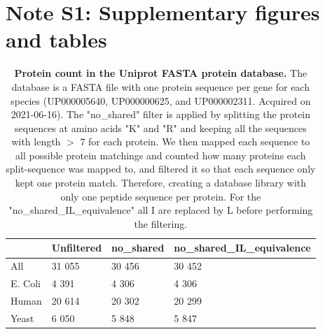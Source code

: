 \documentclass[11pt]{article}
\begin{document}
\maketitle

\section*{Note S1: Supplementary figures and tables}
\label{sec:fc-eval}


\begin{table}[hbt]
\centering
\begin{tabular}{llll}
\hline
        & Unfiltered & no\_shared & no\_shared\_IL\_equivalence \\ \hline
All     & 31 055     & 30 456     & 30 452                      \\
E. Coli & 4 391      & 4 306      & 4 306                       \\
Human   & 20 614     & 20 302     & 20 299                      \\
Yeast   & 6 050      & 5 848      & 5 847                       \\ \hline
\end{tabular}

  \caption{{\bf Protein count in the Uniprot FASTA protein database.} The database is a FASTA file with one protein sequence per gene for each species (UP000005640, UP000000625, and UP000002311. Acquired on 2021-06-16). The "no\_shared" filter is applied by splitting the protein sequences at amino acids "K" and "R" and keeping all the sequences with length $>$ 7 for each protein. We then mapped each sequence to all possible protein matchings and counted how many proteins each split-sequence was mapped to, and filtered it so that each sequence only kept one protein match. Therefore, creating a database library with only one peptide sequence per protein. For the "no\_shared\_IL\_equivalence" all I are replaced by L before performing the filtering. \label{table:proteins_in_database}}

\end{table}
\end{document}
